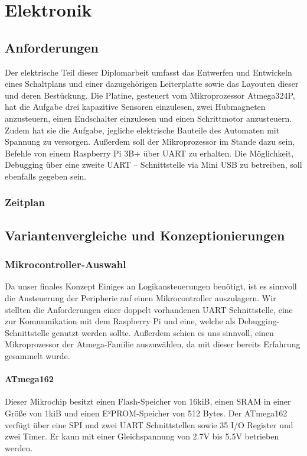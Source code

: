 \chapter{Elektronik}


\section{Anforderungen}

Der elektrische Teil dieser Diplomarbeit umfasst das Entwerfen und Entwickeln eines Schaltplans und einer dazugehörigen Leiterplatte sowie das Layouten dieser und deren Bestückung.
Die Platine, gesteuert vom Mikroprozessor Atmega324P, hat die Aufgabe drei kapazitive Sensoren einzulesen, zwei Hubmagneten anzusteuern, einen Endschalter einzulesen und einen Schrittmotor anzusteuern.
Zudem hat sie die Aufgabe, jegliche elektrische Bauteile des Automaten mit Spannung zu versorgen.
Außerdem soll der Mikroprozessor im Stande dazu sein, Befehle von einem Raspberry Pi 3B+ über UART zu erhalten.
Die Möglichkeit, Debugging über eine zweite UART – Schnittstelle via Mini USB zu betreiben, soll ebenfalls gegeben sein.

\subsection{Zeitplan}

\section{Variantenvergleiche und Konzeptionierungen}
\subsection{Mikrocontroller-Auswahl}
Da unser finales Konzept Einiges an Logikansteuerungen benötigt, ist es sinnvoll die Ansteuerung der Peripherie auf einen Mikrocontroller auszulagern.
Wir stellten die Anforderungen einer doppelt vorhandenen UART Schnittstelle, eine zur Kommunikation mit dem Raspberry Pi und eine, welche als Debugging-Schnittstelle genutzt werden sollte.
Außerdem schien es uns sinnvoll, einen Mikroprozessor der Atmega-Familie auszuwählen, da mit dieser bereits Erfahrung gesammelt wurde.
\subsubsection{ATmega162}
Dieser Mikrochip besitzt einen Flash-Speicher von 16kiB, einen SRAM in einer Größe von 1kiB und einen E²PROM-Speicher von 512 Bytes.
Der ATmega162 verfügt über eine SPI und zwei UART Schnittstellen sowie 35 I/O Register und zwei Timer.
Er kann mit einer Gleichspannung von 2.7V bis 5.5V betrieben werden.
